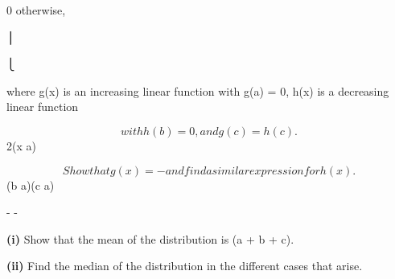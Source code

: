\documentclass[12pt]{article}
\begin{document}
\begin{flushleft}
0 otherwise,\par
⎪\par
⎩\par
where g(x) is an increasing linear function with g(a) = 0, h(x) is a decreasing linear function\par
\[with h(b) = 0, and g(c) = h(c).\]
2(x a)\par
\[Show that g(x) = - and find a similar expression for h(x).\]
(b a)(c a)\par
- -\par
\textbf{(i)} Show that the mean of the distribution is (a + b + c).\par
\textbf{(ii)} Find the median of the distribution in the different cases that arise.\par
\end{flushleft}
\end{document}
